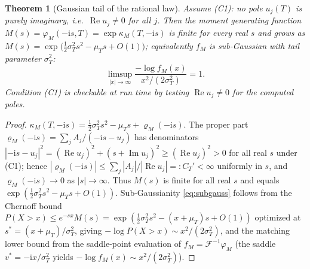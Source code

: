 \documentclass[11pt]{article}
\DeclareMathOperator{\Real}{Re}
\DeclareMathOperator{\Imag}{Im}
\newcommand{\Ii}{\mathrm{i}}
\theoremstyle{plain}
\newtheorem{theorem}{Theorem}[section]
\theoremstyle{definition}
\theoremstyle{remark}
\begin{document}
\begin{theorem}[Gaussian tail of the rational law]\label{thm:gausstail}
Assume \textup{(C1)}: no pole $u_j(T)$ is purely imaginary, i.e.\ $\Real u_j\ne0$
for all $j$. Then the moment generating function
$M(s)=\varphi_M(-\Ii s,T)=\exp\kappa_M(T,-\Ii s)$ is finite for every real $s$ and
grows as $M(s)=\exp\!\bigl(\tfrac12\sigma_T^2 s^2-\mu_T s+O(1)\bigr)$; equivalently
$f_M$ is sub-Gaussian with tail parameter $\sigma_T^2$:
\begin{equation}\label{eq:subgauss}
   \limsup_{|x|\to\infty}\frac{-\log f_M(x)}{x^2/(2\sigma_T^2)}=1 .
\end{equation}
Condition \textup{(C1)} is checkable at run time by testing $\Real u_j\ne0$ for the
computed poles.
\end{theorem}
\begin{proof}
$\kappa_M(T,-\Ii s)=\tfrac12\sigma_T^2 s^2-\mu_T s+\varrho_M(-\Ii s)$. The proper
part $\varrho_M(-\Ii s)=\sum_j A_j/(-\Ii s-u_j)$ has denominators
$|-\Ii s-u_j|^2=(\Real u_j)^2+(s+\Imag u_j)^2\ge(\Real u_j)^2>0$ for all real $s$
under \textup{(C1)}; hence $|\varrho_M(-\Ii s)|\le\sum_j|A_j|/|\Real u_j|=:C_T'<\infty$
uniformly in $s$, and $\varrho_M(-\Ii s)\to0$ as $|s|\to\infty$. Thus $M(s)$ is
finite for all real $s$ and equals $\exp(\tfrac12\sigma_T^2 s^2-\mu_T s+O(1))$.
Sub-Gaussianity \eqref{eq:subgauss} follows from the Chernoff bound
$P(X>x)\le e^{-sx}M(s)=\exp(\tfrac12\sigma_T^2s^2-(x+\mu_T)s+O(1))$ optimized at
$s^\ast=(x+\mu_T)/\sigma_T^2$, giving $-\log P(X>x)\sim x^2/(2\sigma_T^2)$, and the
matching lower bound from the saddle-point evaluation of
$f_M=\mathcal F^{-1}\varphi_M$ (the saddle $v^\ast=-\Ii x/\sigma_T^2$ yields
$-\log f_M(x)\sim x^2/(2\sigma_T^2)$).
\end{proof}
\end{document}
